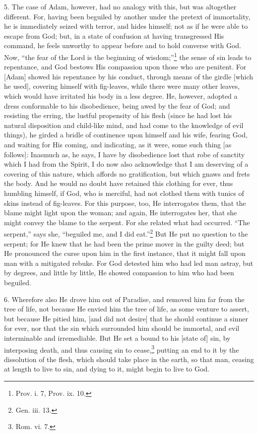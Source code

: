 5. The case of Adam, however, had no analogy with this, but was altogether different. For, having been beguiled by another under the pretext of immortality, he is immediately seized with terror, and hides himself; not as if he were able to escape from God; but, in a state of confusion at having transgressed His command, he feels unworthy to appear before and to hold converse with God. Now, “the fear of the Lord is the beginning of wisdom;”\footnote{Prov. i. 7, Prov. ix. 10.} the sense of sin leads to repentance, and God bestows His compassion upon those who are penitent. For [Adam] showed his repentance by his conduct, through means of the girdle [which he used], covering himself with fig-leaves, while there were many other leaves, which would have irritated his body in a less degree. He, however, adopted a dress conformable to his disobedience, being awed by the fear of God; and resisting the erring, the lustful propensity of his flesh (since he had lost his natural disposition and child-like mind, and had come to the knowledge of evil things), he girded a bridle of continence upon himself and his wife, fearing God, and waiting for His coming, and indicating, as it were, some such thing [as follows]: Inasmuch as, he says, I have by disobedience lost that robe of sanctity which I had from the Spirit, I do now also acknowledge that I am deserving of a covering of this nature, which affords no gratification, but which gnaws and frets the body. And he would no doubt have retained this clothing for ever, thus humbling himself, if God, who is merciful, had not clothed them with tunics of skins instead of fig-leaves. For this purpose, too, He interrogates them, that the blame might light upon the woman; and again, He interrogates her, that she might convey the blame to the serpent. For she related what had occurred. “The serpent,” says she, “beguiled me, and I did eat.”\footnote{Gen. iii. 13.} But He put no question to the serpent; for He knew that he had been the prime mover in the guilty deed; but He pronounced the curse upon him in the first instance, that it might fall upon man with a mitigated rebuke. For God detested him who had led man astray, but by degrees, and little by little, He showed compassion to him who had been beguiled.

6. Wherefore also He drove him out of Paradise, and removed him far from the tree of life, not because He envied him the tree of life, as some venture to assert, but because He pitied him, [and did not desire] that he should continue a sinner for ever, nor that the sin which surrounded him should be immortal, and evil interminable and irremediable. But He set a bound to his [state of] sin, by interposing death, and thus causing sin to cease,\footnote{Rom. vi. 7.} putting an end to it by the dissolution of the flesh, which should take place in the earth, so that man, ceasing at length to live to sin, and dying to it, might begin to live to God.

